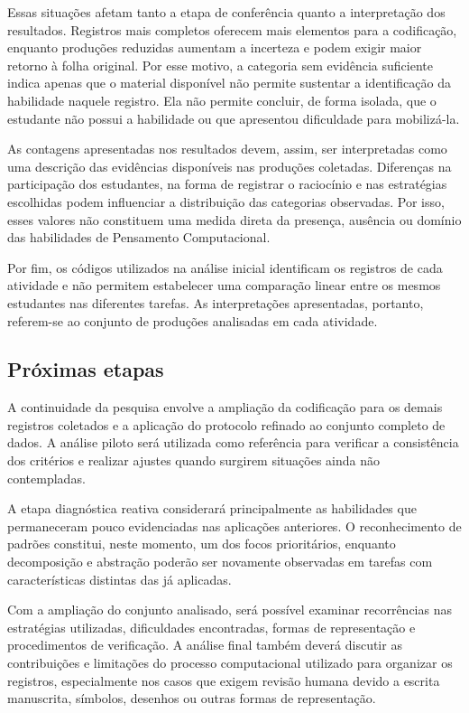 Essas situações afetam tanto a etapa de conferência quanto a interpretação dos resultados. Registros mais completos oferecem mais elementos para a codificação, enquanto produções reduzidas aumentam a incerteza e podem exigir maior retorno à folha original. Por esse motivo, a categoria sem evidência suficiente indica apenas que o material disponível não permite sustentar a identificação da habilidade naquele registro. Ela não permite concluir, de forma isolada, que o estudante não possui a habilidade ou que apresentou dificuldade para mobilizá-la.

As contagens apresentadas nos resultados devem, assim, ser interpretadas como uma descrição das evidências disponíveis nas produções coletadas. Diferenças na participação dos estudantes, na forma de registrar o raciocínio e nas estratégias escolhidas podem influenciar a distribuição das categorias observadas. Por isso, esses valores não constituem uma medida direta da presença, ausência ou domínio das habilidades de Pensamento Computacional.

Por fim, os códigos utilizados na análise inicial identificam os registros de cada atividade e não permitem estabelecer uma comparação linear entre os mesmos estudantes nas diferentes tarefas. As interpretações apresentadas, portanto, referem-se ao conjunto de produções analisadas em cada atividade.

\subsection{Próximas etapas}

A continuidade da pesquisa envolve a ampliação da codificação para os demais registros coletados e a aplicação do protocolo refinado ao conjunto completo de dados. A análise piloto será utilizada como referência para verificar a consistência dos critérios e realizar ajustes quando surgirem situações ainda não contempladas. 

A etapa diagnóstica reativa considerará principalmente as habilidades que permaneceram pouco evidenciadas nas aplicações anteriores. O reconhecimento de padrões constitui, neste momento, um dos focos prioritários, enquanto decomposição e abstração poderão ser novamente observadas em tarefas com características distintas das já aplicadas.

Com a ampliação do conjunto analisado, será possível examinar recorrências nas estratégias utilizadas, dificuldades encontradas, formas de representação e procedimentos de verificação. A análise final também deverá discutir as contribuições e limitações do processo computacional utilizado para organizar os registros, especialmente nos casos que exigem revisão humana devido a escrita manuscrita, símbolos, desenhos ou outras formas de representação.

